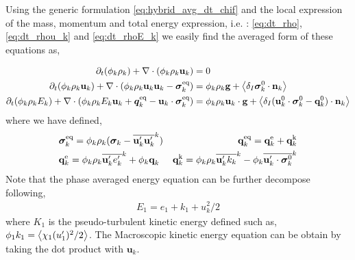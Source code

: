 Using the generic formulation \ref{eq:hybrid_avg_dt_chif} and the local expression of the mass, momentum and total energy expression, i.e. : \ref{eq:dt_rho},\ref{eq:dt_rhou_k} and \ref{eq:dt_rhoE_k} we easily find the averaged form of these equations as, 

\begin{align}
    \label{eq:dt_&vg_rho}
    \partial_t (\phi_k \rho_k)  
    + \mathbf{\nabla}\cdot (
        \phi_k \rho_k\textbf{u}_k
    )
    &= 
    0\\
    \label{eq:dt_&vg_rhou_k}
    \partial_t (\phi_k \rho_k\textbf{u}_k)  
    + \mathbf{\nabla}\cdot (
        \phi_k \rho_k\textbf{u}_k\textbf{u}_k
        - \bm{\sigma}_k^\text{eq}
    )
    &= 
    \phi_k \rho_k \textbf{g} 
    +  \left<\delta_I \bm{\sigma}_k^0 \cdot \textbf{n}_k\right>\\
    \label{eq:dt_&vg_rhoE_k}
    \partial_t (\phi_k\rho_kE_k)  
    + \mathbf{\nabla}\cdot (
        \phi_k\rho_kE_k\textbf{u}_k
        + \bm{q}_k^\text{eq}
        - \textbf{u}_k \cdot \bm{\sigma}_k^\text{eq}
        )
    &= 
    \phi_k \rho_k\textbf{u}_k \cdot \textbf{g} 
    + \left<\delta_I (\textbf{u}_k^0 \cdot \bm{\sigma}_k^0 - \textbf{q}_k^0)\cdot \textbf{n}_k\right>
\end{align} 
where we have defined, 
\begin{align*}
    &\bm{\sigma}_k^\text{eq}
    = \phi_k\rho_k (
        \bm{\sigma}_k%
        - \kavg{\textbf{u}_k'\textbf{u}_k'})  
    &\textbf{q}_k^\text{eq}
    =\textbf{q}_k^\text{e} +\textbf{q}_k^\text{k}  \\
    &\textbf{q}_k^\text{e}
    = \phi_k\rho_k \kavg{\textbf{u}_k' e_k'} 
    + \phi_k\textbf{q}_k 
    &\textbf{q}_k^\text{k}
    = \phi_k\rho_k \kavg{\textbf{u}_k' k_k} 
    - \phi_k\kavg{\textbf{u}_k' \cdot \bm{\sigma}_k^0}
\end{align*}
Note that the phase averaged energy equation can be further decompose following, 
\begin{align*}
    E_1 = e_1 + k_1 + u_k^2/2
\end{align*}
where $K_1$ is the pseudo-turbulent kinetic energy defined such as, $\phi_1 k_1 = \left<\chi_1 (u_1')^2/2\right>$. 
The Macroscopic kinetic energy equation can be obtain by taking the dot product with $\textbf{u}_k$. 
